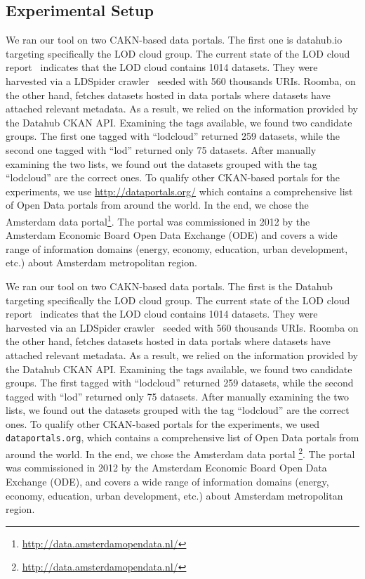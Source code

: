 \documentclass[runningheads,a4paper]{llncs}
\begin{document}
\subsection{Experimental Setup}
We ran our tool on two CAKN-based data portals. The first one is datahub.io targeting specifically the LOD cloud group. The current state of the LOD cloud report~\cite{DBLP:conf/semweb/SchmachtenbergBP14} indicates that the LOD cloud contains 1014 datasets. They were harvested via a LDSpider crawler~\cite{conf/semweb/IseleUBH10} seeded with 560 thousands URIs. Roomba, on the other hand, fetches datasets hosted in data portals where datasets have attached relevant metadata. As a result, we relied on the information provided by the Datahub CKAN API. Examining the tags available, we found two candidate groups. The first one tagged with ``lodcloud'' returned 259 datasets, while the second one tagged with ``lod'' returned only 75 datasets. After manually examining the two lists, we found out the datasets grouped with the tag ``lodcloud'' are the correct ones. To qualify other CKAN-based portals for the experiments, we use \url{http://dataportals.org/} which contains a comprehensive list of Open Data portals from around the world. In the end, we chose the Amsterdam data portal\footnote{\url{http://data.amsterdamopendata.nl/}}. The portal was commissioned in 2012 by the Amsterdam Economic Board Open Data Exchange (ODE) and covers a wide range of information domains (energy, economy, education, urban development, etc.) about Amsterdam metropolitan region.

We ran our tool on two CAKN-based data portals. The first is the Datahub targeting specifically the LOD cloud group. The current state of the LOD cloud report~\cite{DBLP:conf/semweb/SchmachtenbergBP14} indicates that the LOD cloud contains 1014 datasets. They were harvested via an LDSpider crawler~\cite{conf/semweb/IseleUBH10} seeded with 560 thousands URIs. Roomba on the other hand, fetches datasets hosted in data portals where datasets have attached relevant metadata. As a result, we relied on the information provided by the Datahub CKAN API. Examining the tags available, we found two candidate groups. The first tagged with ``lodcloud'' returned 259 datasets, while the second tagged with ``lod'' returned only 75 datasets. After manually examining the two lists, we found out the datasets grouped with the tag ``lodcloud'' are the correct ones. To qualify other CKAN-based portals for the experiments, we used \texttt{dataportals.org}, which contains a comprehensive list of Open Data portals from around the world. In the end, we chose the Amsterdam data portal \footnote{\url{http://data.amsterdamopendata.nl/}}. The portal was commissioned in 2012 by the Amsterdam Economic Board Open Data Exchange (ODE), and covers a wide range of information domains (energy, economy, education, urban development, etc.) about Amsterdam metropolitan region.
\end{document}
